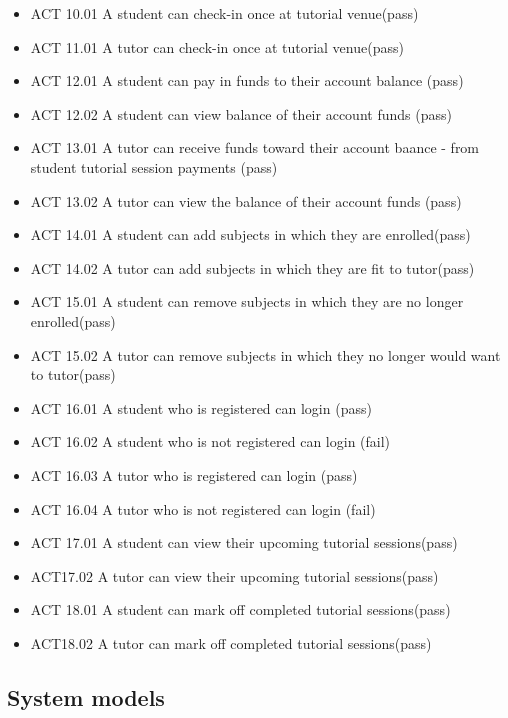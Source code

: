 \documentclass[12pt]{article}
\begin{document}
\begin{itemize}
\item ACT 10.01 A student can check-in once at tutorial venue(pass)
\item ACT 11.01 A tutor can check-in once at tutorial venue(pass)
\item ACT 12.01 A student can pay in funds to their account balance (pass)
\item ACT 12.02 A student can view balance of their account funds (pass)
\item ACT 13.01 A tutor can receive funds toward their account baance - from student tutorial session payments (pass)
\item ACT 13.02 A tutor can view the balance of their account funds (pass)
\item ACT 14.01 A student can add subjects in which they are enrolled(pass)
\item ACT 14.02 A tutor can add subjects in which they are fit to tutor(pass)
\item ACT 15.01 A student can remove subjects in which they are no longer enrolled(pass)
\item ACT 15.02 A tutor can remove subjects in which they no longer would want to tutor(pass)
\item ACT 16.01 A student who is registered can login (pass)
\item ACT 16.02 A student who is not registered can login (fail)
\item ACT 16.03 A tutor who is registered can login (pass)
\item ACT 16.04 A tutor who is not registered can login (fail)
\item ACT 17.01 A student can view their upcoming tutorial sessions(pass)
\item ACT17.02	A tutor can view their upcoming tutorial sessions(pass)
\item ACT 18.01 A student can mark off completed tutorial sessions(pass)
\item ACT18.02	A tutor can mark off completed tutorial sessions(pass)
\end{itemize}

\subsection{System models}
\end{document}
